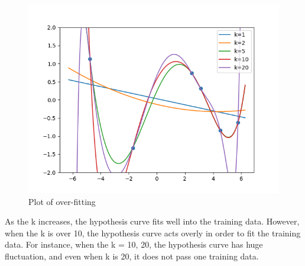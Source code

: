 \begin{answer}

    \begin{figure}[h]
        \centering
        \includegraphics[width=0.6\linewidth]{tex/featuremaps/plot_e.png}
        \caption{Plot of over-fitting}
        \label{fig:my_label}
    \end{figure}
    
    As the k increases, the hypothesis curve fits well into the training data. However, when the k is over 10, the hypothesis curve acts overly in order to fit the training data. For instance, when the k = 10, 20, the hypothesis curve has huge fluctuation, and even when k is 20, it does not pass one training data. 

\end{answer}
